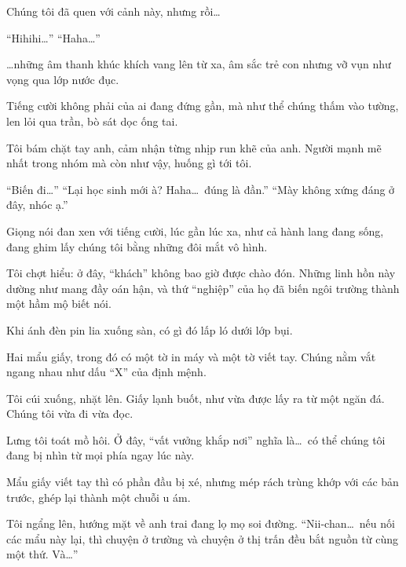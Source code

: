 \documentclass[../main.tex]{subfiles}
\begin{document}
Chúng tôi đã quen với cảnh này, nhưng rồi\dots

``Hihihi\dots'' ``Haha\dots''

\dots những âm thanh khúc khích vang lên từ xa, âm sắc trẻ con nhưng vỡ vụn như vọng qua lớp nước đục.

Tiếng cười không phải của ai đang đứng gần, mà như thể chúng thấm vào tường, len lỏi qua trần, bò sát dọc ống tai.

Tôi bám chặt tay anh, cảm nhận từng nhịp run khẽ của anh. Người mạnh mẽ nhất trong nhóm mà còn như vậy, huống gì tới tôi.

``Biến đi\dots'' ``Lại học sinh mới à? Haha\dots\ đúng là đần.'' ``Mày không xứng đáng ở đây, nhóc ạ.''

Giọng nói đan xen với tiếng cười, lúc gần lúc xa, như cả hành lang đang sống, đang ghim lấy chúng tôi bằng những đôi mắt vô hình.

Tôi chợt hiểu: ở đây, ``khách'' không bao giờ được chào đón. Những linh hồn này dường như mang đầy oán hận, và thứ ``nghiệp'' của họ đã biến ngôi trường thành một hầm mộ biết nói.

Khi ánh đèn pin lia xuống sàn, có gì đó lấp ló dưới lớp bụi.

Hai mẩu giấy, trong đó có một tờ in máy và một tờ viết tay. Chúng nằm vắt ngang nhau như dấu ``X'' của định mệnh.

Tôi cúi xuống, nhặt lên. Giấy lạnh buốt, như vừa được lấy ra từ một ngăn đá. Chúng tôi vừa đi vừa đọc.


Lưng tôi toát mồ hôi. Ở đây, ``vất vưởng khắp nơi'' nghĩa là\dots\ có thể chúng tôi đang bị nhìn từ mọi phía ngay lúc này.

Mẩu giấy viết tay thì có phần đầu bị xé, nhưng mép rách trùng khớp với các bản trước, ghép lại thành một chuỗi u ám.


Tôi ngẩng lên, hướng mặt về anh trai đang lọ mọ soi đường. ``Nii-chan\dots\ nếu nối các mẩu này lại, thì chuyện ở trường và chuyện ở thị trấn đều bắt nguồn từ cùng một thứ. Và\dots''
\end{document}
